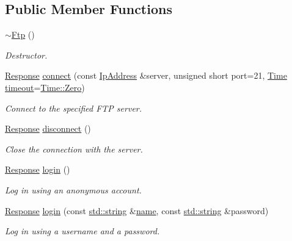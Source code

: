 \subsection*{Public Member Functions}
\begin{DoxyCompactItemize}
\item 
\hyperlink{classsf_1_1_ftp_a2edfa8e9009caf27bce74459ae76dc52}{$\sim$\-Ftp} ()
\begin{DoxyCompactList}\small\item\em Destructor. \end{DoxyCompactList}\item 
\hyperlink{classsf_1_1_ftp_1_1_response}{Response} \hyperlink{classsf_1_1_ftp_af02fb3de3f450a50a27981961c69c860}{connect} (const \hyperlink{classsf_1_1_ip_address}{Ip\-Address} \&server, unsigned short port=21, \hyperlink{classsf_1_1_time}{Time} \hyperlink{gl3_8h_ad29bb0d8468b264a4e3d9204366cfaab}{timeout}=\hyperlink{classsf_1_1_time_a8db127b632fa8da21550e7282af11fa0}{Time\-::\-Zero})
\begin{DoxyCompactList}\small\item\em Connect to the specified F\-T\-P server. \end{DoxyCompactList}\item 
\hyperlink{classsf_1_1_ftp_1_1_response}{Response} \hyperlink{classsf_1_1_ftp_acf7459926f3391cd06bf84337ed6a0f4}{disconnect} ()
\begin{DoxyCompactList}\small\item\em Close the connection with the server. \end{DoxyCompactList}\item 
\hyperlink{classsf_1_1_ftp_1_1_response}{Response} \hyperlink{classsf_1_1_ftp_a686262bc377584cd50e52e1576aa3a9b}{login} ()
\begin{DoxyCompactList}\small\item\em Log in using an anonymous account. \end{DoxyCompactList}\item 
\hyperlink{classsf_1_1_ftp_1_1_response}{Response} \hyperlink{classsf_1_1_ftp_a99d8114793c1659e9d51d45cecdcd965}{login} (const \hyperlink{gl3_8h_ac83513893df92266f79a515488701770}{std\-::string} \&\hyperlink{gl3_8h_aaced7cfc21e7d37775d6921bb8177239}{name}, const \hyperlink{gl3_8h_ac83513893df92266f79a515488701770}{std\-::string} \&password)
\begin{DoxyCompactList}\small\item\em Log in using a username and a password. \end{DoxyCompactList}\item 

\end{DoxyCompactItemize}
